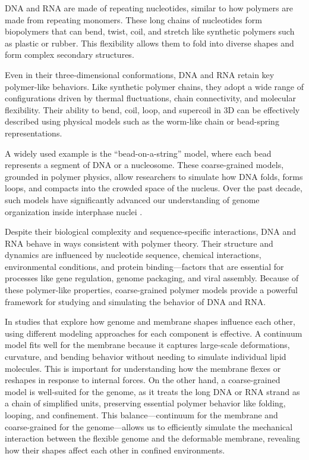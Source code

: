 \documentclass[12pt]{article}
\begin{document}
\begin{flushleft}
DNA and RNA are made of repeating nucleotides, similar to how polymers are made from repeating monomers. These long chains of nucleotides form biopolymers that can bend, twist, coil, and stretch like synthetic polymers such as plastic or rubber. This flexibility allows them to fold into diverse shapes and form complex secondary structures.

Even in their three-dimensional conformations, DNA and RNA retain key polymer-like behaviors. Like synthetic polymer chains, they adopt a wide range of configurations driven by thermal fluctuations, chain connectivity, and molecular flexibility. Their ability to bend, coil, loop, and supercoil in 3D can be effectively described using physical models such as the worm-like chain or bead-spring representations.

A widely used example is the “bead-on-a-string” model, where each bead represents a segment of DNA or a nucleosome. These coarse-grained models, grounded in polymer physics, allow researchers to simulate how DNA folds, forms loops, and compacts into the crowded space of the nucleus. Over the past decade, such models have significantly advanced our understanding of genome organization inside interphase nuclei \cite{Lizana2024}.

Despite their biological complexity and sequence-specific interactions, DNA and RNA behave in ways consistent with polymer theory. Their structure and dynamics are influenced by nucleotide sequence, chemical interactions, environmental conditions, and protein binding—factors that are essential for processes like gene regulation, genome packaging, and viral assembly. Because of these polymer-like properties, coarse-grained polymer models provide a powerful framework for studying and simulating the behavior of DNA and RNA.



In studies that explore how genome and membrane shapes influence each other, using different modeling approaches for each component is effective. A continuum model fits well for the membrane because it captures large-scale deformations, curvature, and bending behavior without needing to simulate individual lipid molecules. This is important for understanding how the membrane flexes or reshapes in response to internal forces. On the other hand, a coarse-grained model is well-suited for the genome, as it treats the long DNA or RNA strand as a chain of simplified units, preserving essential polymer behavior like folding, looping, and confinement. This balance—continuum for the membrane and coarse-grained for the genome—allows us to efficiently simulate the mechanical interaction between the flexible genome and the deformable membrane, revealing how their shapes affect each other in confined environments.




\end{flushleft}
\end{document}
